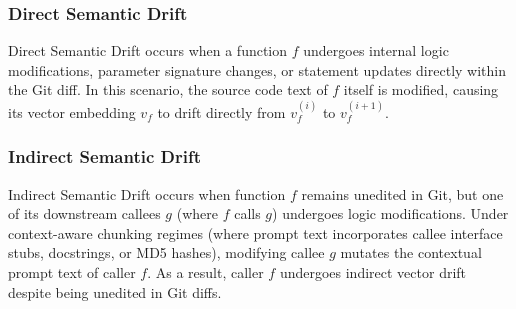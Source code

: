 \documentclass[conference]{IEEEtran}
\begin{document}
\subsubsection{Direct Semantic Drift}
Direct Semantic Drift occurs when a function $f$ undergoes internal logic modifications, parameter signature changes, or statement updates directly within the Git diff. In this scenario, the source code text of $f$ itself is modified, causing its vector embedding $v_f$ to drift directly from $v_f^{(i)}$ to $v_f^{(i+1)}$.

\subsubsection{Indirect Semantic Drift}
Indirect Semantic Drift occurs when function $f$ remains unedited in Git, but one of its downstream callees $g$ (where $f$ calls $g$) undergoes logic modifications. Under context-aware chunking regimes (where prompt text incorporates callee interface stubs, docstrings, or MD5 hashes), modifying callee $g$ mutates the contextual prompt text of caller $f$. As a result, caller $f$ undergoes indirect vector drift despite being unedited in Git diffs.
\end{document}
